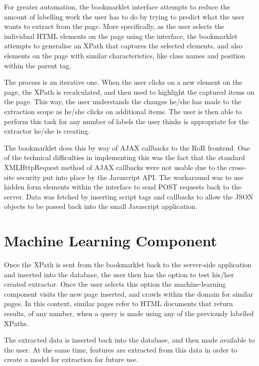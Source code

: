 For greater automation, the bookmarklet interface attempts to reduce the amount of labelling work the user has to do by trying to predict what the user wants to extract from the page. More specifically, as the user selects the individual HTML elements on the page using the interface, the bookmarklet attempts to generalise an XPath that captures the selected elements, and also elements on the page with similar characteristics, like class names and position within the parent tag.


The process is an iterative one. When the user clicks on a new element on the page, the XPath is recalculated, and then used to highlight the captured items on the page. This way, the user understands the changes he/she has made to the extraction scope as he/she clicks on additional items. The user is then able to perform this task for any number of labels the user thinks is appropriate for the extractor he/she is creating.

The bookmarklet does this by way of AJAX callbacks to the RoR frontend. One of the technical difficulties in implementing this was the fact that the standard XMLHttpRequest method of AJAX callbacks were not usable due to the cross-site security put into place by the Javascript API. The workaround was to use hidden form elements within the interface to send POST requests back to the server. Data was fetched by inserting script tags and callbacks to allow the JSON objects to be passed back into the small Javascript application.

\section{Machine Learning Component}
Once the XPath is sent from the bookmarklet back to the server-side application and inserted into the database, the user then has the option to test his/her created extractor. Once the user selects this option the machine-learning component visits the new page inserted, and crawls within the domain for similar pages. In this context, similar pages refer to HTML documents that return results, of any number, when a query is made using any of the previously labelled XPaths. 



	The extracted data is inserted back into the database, and then made available to the user. At the same time, features are extracted from this data in order to create a model for extraction for future use.
	
	
